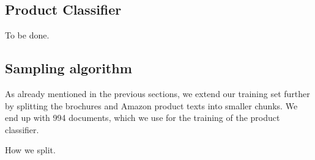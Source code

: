 \subsection{Product Classifier}
To be done.

\subsection{Sampling algorithm}
As already mentioned in the previous sections, we extend our training set further by splitting the brochures and Amazon product texts into smaller chunks.
We end up with 994 documents, which we use for the training of the product classifier.

How we split.
